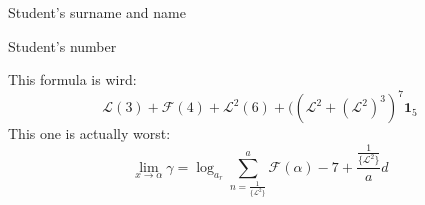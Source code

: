 \documentclass[11pt,reqno]{amsart}
\newcommand{\F}{\mathcal{F}} %
\renewcommand{\L}{\mathcal{L}} %
\newcommand{\LL}{\L^2} %
\newcommand{\LLL}{(\L^2+(\LL)^3} %
\newcommand{\zaa}{\alpha}
\newcommand{\zg}{\gamma}
\newcommand{\weird}[3]{\sum_{n = #1}^{#2} \F(#3) - 7 +\frac{#1}{#2}}
\def\indicator{\mathbf{1}}
\begin{document}
\noindent
Student's surname and name \underline{\hspace{68.5ex}}

\vspace{1.5ex}

\noindent
Student's number \underline{\hspace{80ex}}


\vspace{8ex}
This formula is wird:
$$\L(3) + \F(4) + \LL(6) + (\LLL)^7 \indicator_{5}$$
This one is actually worst:
$$\lim_{x\to\zaa} \zg=\log_a_r \weird{\frac{1}{\{\LL\}}}{a}\alpha d$$

\noindent
\end{document}
